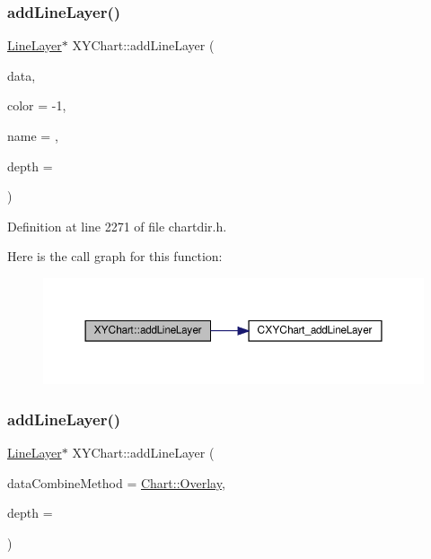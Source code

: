 \subsubsection{\texorpdfstring{add\+Line\+Layer()}{addLineLayer()}\hspace{0.1cm}{\footnotesize\ttfamily [2/3]}}
{\footnotesize\ttfamily \hyperlink{class_line_layer}{Line\+Layer}$\ast$ X\+Y\+Chart\+::add\+Line\+Layer (\begin{DoxyParamCaption}\item[{\hyperlink{class_double_array}{Double\+Array}}]{data,  }\item[{int}]{color = {\ttfamily -\/1},  }\item[{const char $\ast$}]{name = {},  }\item[{int}]{depth = {} }\end{DoxyParamCaption})\hspace{0.3cm}{\ttfamily [inline]}}



Definition at line 2271 of file chartdir.\+h.

Here is the call graph for this function\+:
\nopagebreak
\begin{figure}[H]
\begin{center}
\leavevmode
\includegraphics[width=350pt]{class_x_y_chart_a7071e482b072e63f9e9004b4d27f39fe_cgraph}
\end{center}
\end{figure}
\mbox{\label{class_x_y_chart_aba9690faaa6eed9b6bc44485dc0b955d}} 
\subsubsection{\texorpdfstring{add\+Line\+Layer()}{addLineLayer()}\hspace{0.1cm}{\footnotesize\ttfamily [3/3]}}
{\footnotesize\ttfamily \hyperlink{class_line_layer}{Line\+Layer}$\ast$ X\+Y\+Chart\+::add\+Line\+Layer (\begin{DoxyParamCaption}\item[{int}]{data\+Combine\+Method = {\ttfamily \hyperlink{namespace_chart_af7052bb2fea3a81e43d3812503b3b779a5586cefdf5069b2df79d2f82fd8666e2}{Chart\+::\+Overlay}},  }\item[{int}]{depth = {} }\end{DoxyParamCaption})\hspace{0.3cm}{\ttfamily [inline]}}




